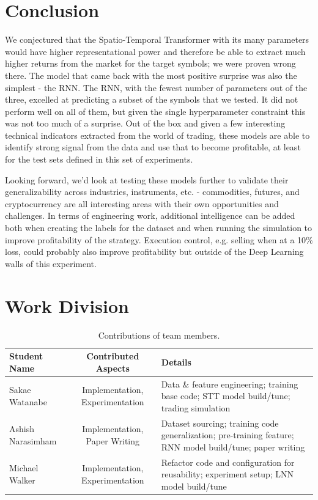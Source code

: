 \documentclass[10pt,twocolumn,letterpaper]{article}
\begin{document}
\section{Conclusion}

We conjectured that the Spatio-Temporal Transformer with its many parameters would have higher representational power and therefore be able to extract much higher returns from the market for the target symbols; we were proven wrong there. The model that came back with the most positive surprise was also the simplest - the RNN. The RNN, with the fewest number of parameters out of the three, excelled at predicting a subset of the symbols that we tested. It did not perform well on all of them, but given the single hyperparameter constraint this was not too much of a surprise. Out of the box and given a few interesting technical indicators extracted from the world of trading, these models are able to identify strong signal from the data and use that to become profitable, at least for the test sets defined in this set of experiments.

Looking forward, we’d look at testing these models further to validate their generalizability across industries, instruments, etc. - commodities, futures, and cryptocurrency are all interesting areas with their own opportunities and challenges. In terms of engineering work, additional intelligence can be added both when creating the labels for the dataset and when running the simulation to improve profitability of the strategy. Execution control, e.g. selling when at a 10\% loss, could probably also improve profitability but outside of the Deep Learning walls of this experiment.


\clearpage
\section{Work Division}

\begin{table}
\begin{tabular}{|l|c|p{8cm}|}
\hline
Student Name & Contributed Aspects & Details \\
\hline\hline
Sakae Watanabe & Implementation, Experimentation & Data \& feature engineering; training base code; STT model build/tune; trading simulation\\
Ashish Narasimham & Implementation, Paper Writing & Dataset sourcing; training code generalization; pre-training feature; RNN model build/tune; paper writing \\
Michael Walker & Implementation, Experimentation & Refactor code and configuration for reusability; experiment setup; LNN model build/tune \\
\hline
\end{tabular}
\caption{Contributions of team members.}
\label{tab:contributions}
\end{table}
\end{document}
